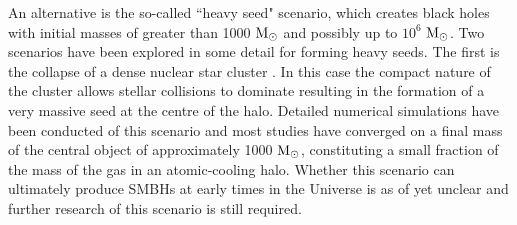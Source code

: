 \documentclass[graphics, twocolumn, usenatbib]{mn2e}
\newcommand{\msolar} {$\rm{M_{\odot}}~$}
\newcommand{\msolarc} {$\rm{M_{\odot}}$}
\begin{document}
\indent An alternative is the so-called ``heavy seed" scenario, which creates black holes with initial masses of
greater than 1000 \msolar and possibly up to $10^{6}$ \msolarc. Two scenarios have been
explored in some detail for forming heavy seeds. The first is the collapse of a dense
nuclear star cluster \citep{PortegiesZwart_2004, Freitag_2008, Omukai_2008,Devecchi_2008, Merritt_2008,
  Davies_2011, Lupi_2014}. In this case the compact nature of the cluster allows
stellar collisions to dominate resulting in the formation of a very massive seed at the
centre of the halo. Detailed numerical simulations have been conducted \cite[e.g.][]{Katz_2015,
  Reinoso_2018, Sakurai_2019} of this scenario and
most studies have converged on a final mass of the central object of approximately 1000 \msolarc, constituting a small fraction of the mass of the gas in an atomic-cooling halo.
Whether this scenario can ultimately produce SMBHs at early times in the Universe is as of yet
unclear and further research of this scenario is still required. \\
\end{document}

